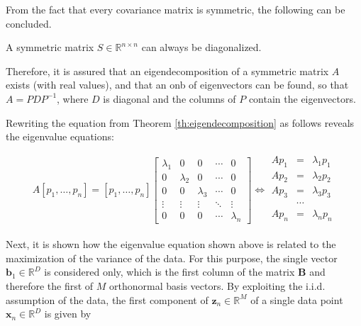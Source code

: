 \documentclass[../../../main.tex]{subfiles}
\begin{document}
From the fact that every covariance matrix is symmetric, the following can be concluded.

\begin{theorem}
A symmetric matrix $S \in \mathbb{R}^{n \times n}$ can always be diagonalized.
\end{theorem}

Therefore, it is assured that an eigendecomposition of a symmetric matrix $A$ exists (with real values), and that an \acrshort{onb} of eigenvectors can be found, so that $A=PDP^{-1}$, where $D$ is diagonal and the columns of $P$ contain the eigenvectors.

Rewriting the equation from Theorem \ref{th:eigendecomposition} as follows reveals the eigenvalue equations:

\begin{equation*}
        A [p_1, \dots, p_n] = [p_1, \dots, p_n] \left[\begin{array}{ccccc}
            \lambda_1 & 0 & 0 & \cdots & 0 \\
            0 & \lambda_2 & 0 & \cdots & 0 \\
            0 & 0 & \lambda_3 & \cdots & 0 \\
            \vdots & \vdots & \vdots & \ddots & \vdots \\
            0 & 0 & 0 & \cdots & \lambda_n
        \end{array}\right] \Longleftrightarrow \begin{array}{ccc} 
            Ap_1 &= &\lambda_1p_1\\
            Ap_2 &= &\lambda_2p_2\\
            Ap_3 &= &\lambda_3p_3\\
            & \cdots& \\
            Ap_n &= &\lambda_np_n\\
        \end{array}
\end{equation*}


Next, it is shown how the eigenvalue equation shown above is related to the maximization of the variance of the data. For this purpose, the single vector $\bm{b}_1 \in \mathbb{R}^D$ is considered only, which is the first column of the matrix $\bm{B}$ and therefore the first of $M$ orthonormal basis vectors. By exploiting the i.i.d. assumption of the data, the first component of $\bm{z}_n \in \mathbb{R}^M$ of a single data point $\bm{x}_n \in \mathbb{R}^D$ is given by
\end{document}
